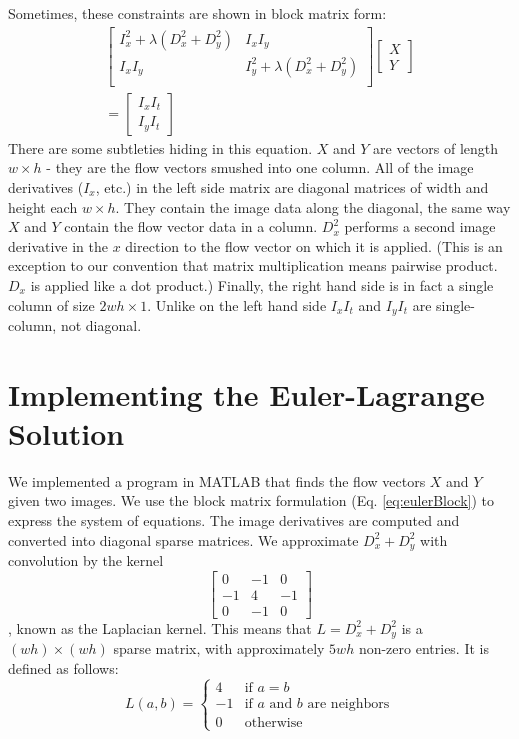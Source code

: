 \documentclass[10pt,twocolumn,letterpaper]{article}
\begin{document}
Sometimes, these constraints are shown in block matrix form:
\begin{multline} \label{eq:eulerBlock}
\left[ \begin{array}{cc}
I_x^2 + \lambda (D_x^2 + D_y^2) & I_x I_y\\
I_x I_y & I_y^2 + \lambda (D_x^2 + D_y^2) \\
\end{array} \right]
\left[\begin{array}{c}
X \\
Y
\end{array} \right] \\
=\left[ \begin{array}{c}
I_x I_t \\
I_y I_t
\end{array} \right]
\end{multline}
There are some subtleties hiding in this equation.  $X$ and $Y$ are vectors of length $w \times h$ - they are the flow vectors smushed into one column.  All of the image derivatives ($I_x$, etc.) in the left side matrix are diagonal matrices of width and height each $w \times h$.  They contain the image data along the diagonal, the same way $X$ and $Y$ contain the flow vector data in a column.  $D_x^2$ performs a second image derivative in the $x$ direction to the flow vector on which it is applied.  (This is an exception to our convention that matrix multiplication means pairwise product.  $D_x$ is applied like a dot product.)  Finally, the right hand side is in fact a single column of size $2wh \times 1$.  Unlike on the left hand side $I_x I_t$ and $I_y I_t$ are single-column, not diagonal.

\section{Implementing the Euler-Lagrange Solution}

We implemented a program in MATLAB that finds the flow vectors $X$ and $Y$ given two images.  We use the block matrix formulation (Eq. \ref{eq:eulerBlock}) to express the system of equations.  The image derivatives are computed and converted into diagonal sparse matrices.  We approximate $D_x^2 + D_y^2$ with convolution by the kernel
\begin{equation} \label{eq:laplacian}
\left[ \begin{array}{ccc}
0 & -1 & 0 \\
-1 & 4 & -1 \\
0 & -1 & 0
\end{array} \right]
\end{equation}
, known as the Laplacian kernel.  This means that $L = D_x^2 + D_y^2$ is a $(wh) \times (wh)$ sparse matrix, with approximately $5wh$ non-zero entries.  It is defined as follows:
\begin{equation} \label{eq:laplacian2}
L(a, b) = \begin{cases}
4 & \text{if } a = b \\
-1 & \text{if $a$ and $b$ are neighbors} \\
0 & \text{otherwise}
\end{cases}
\end{equation}
\end{document}
